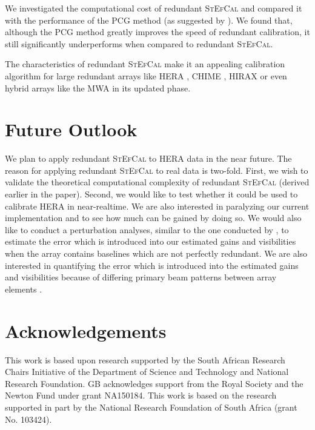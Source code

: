 \documentclass[useAMS,usenatbib]{mn2e}
\begin{document}
We investigated the computational cost of redundant \textsc{StEfCal} and compared it with the performance of the PCG method (as suggested by \cite{Liu2010}).
We found that, although the PCG method greatly improves the speed of redundant calibration, it still significantly underperforms when compared to redundant \textsc{StEfCal}.

The characteristics of redundant \textsc{StEfCal} make it an appealing calibration algorithm for large redundant arrays like HERA \citep{deboer2017}, CHIME \citep{Bandura2014}, HIRAX \citep{Newburgh2016} or even hybrid arrays like the MWA \citep{Tingay2013} in its updated phase.

\section{Future Outlook}
We plan to apply redundant \textsc{StEfCal} to HERA data in the near future. The reason for applying redundant \textsc{StEfCal} to real data is two-fold. First, we wish to validate the theoretical computational
complexity of redundant \textsc{StEfCal} (derived earlier in the paper). Second, we would like to test whether it could be used to calibrate HERA in near-realtime. 
We are also interested in paralyzing our current implementation and to see how much can be gained by doing so. We would also like to 
conduct a perturbation analyses, similar to the one conducted by \cite{Liu2010}, to estimate the error which is introduced into our 
estimated gains and visibilities when the array contains baselines which are not perfectly redundant. We are also interested in quantifying 
the error which is introduced into the estimated gains and visibilities because of differing primary beam patterns between array elements \citep{Noorishad2012}. 

\section*{Acknowledgements}
This work is based upon research supported by the South African Research Chairs Initiative of the Department of Science and Technology and National Research Foundation. GB acknowledges support from the Royal Society and the Newton Fund under grant NA150184. This work is based on the research supported in part by the National Research Foundation of South Africa (grant No. 103424).




\appendix
\end{document}
